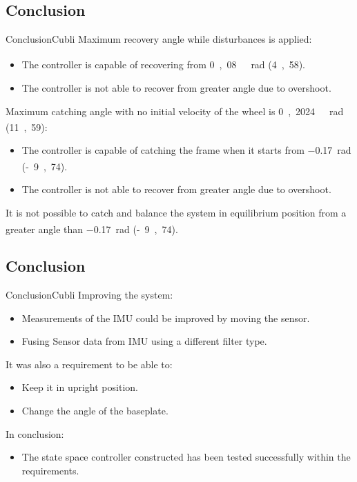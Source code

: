 \subsection{Conclusion}

\begin{frame}{Conclusion}{Cubli}
Maximum recovery angle while disturbances is applied:
	\begin{itemize}
		\item {The controller is capable of recovering from \si{0,08\ rad} (\si{4,58^\circ}).}
		\item {The controller is not able to recover from greater angle due to overshoot.}\linebreak
	\end{itemize}
	
Maximum catching angle with no initial velocity of the wheel is \si{0,2024\ rad} (\si{11,59^\circ}):
	\begin{itemize}
		\item {The controller is capable of catching the frame when it starts from \SI{-0,17}{rad}  (\si{-9,74^\circ}).}
		\item {The controller is not able to recover from greater angle due to overshoot.}\linebreak
	\end{itemize}
It is not possible to catch and balance the system in equilibrium position from a  greater angle than \SI{-0,17}{rad}  (\si{-9,74^\circ}).\linebreak
\end{frame}
\subsection{Conclusion}

\begin{frame}{Conclusion}{Cubli}
	Improving the system:
	\begin{itemize}
		\item {Measurements of the IMU could be improved by moving the sensor.}
		\item {Fusing Sensor data from IMU using a different filter type.}\linebreak
	\end{itemize}
	
It was also a requirement to be able to:
	\begin{itemize}
		\item {Keep it in upright position.}
		\item {Change the angle of the baseplate.}\linebreak
	\end{itemize}
	
In conclusion:
	\begin{itemize}
		\item {The state space controller constructed has been tested successfully within the requirements.}
	\end{itemize}
\end{frame}
